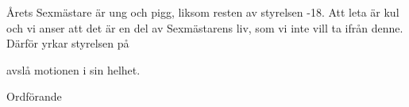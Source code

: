 \documentclass[../_main/handlingar.tex]{subfiles}
\begin{document}
\motionssvar
Årets Sexmästare är ung och pigg, liksom resten av styrelsen -18. Att leta är kul och vi anser att det är en del av Sexmästarens liv, som vi inte vill ta ifrån denne. 
Därför yrkar styrelsen på 

\begin{attsatser}
    \att avslå motionen i sin helhet.
\end{attsatser}

\begin{signatures}{1}
    \ist
    \signature{Daniel Bakic}{Ordförande}
\end{signatures}
\end{document}
